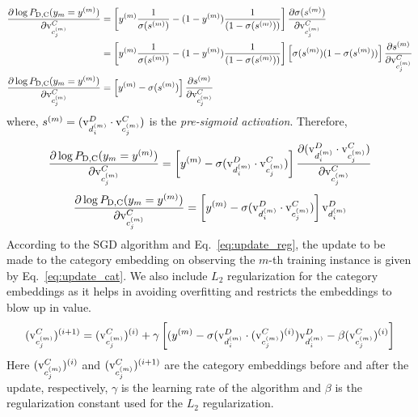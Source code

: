 \begin{align}
\frac{\partial \log P_{\mathrm{D}, \mathrm{C}}(y_{m}=y^{(m)})} {\partial \mathrm{v}^{C}_{c^{(m)}_{j}}} &= \left[ y^{(m)}\frac{1}{\sigma(s^{(m)})} - (1-y^{(m)})\frac{1}{(1 - \sigma(s^{(m)}))}\right] \frac{\partial \sigma(s^{(m)})}{\partial \mathrm{v}^{C}_{c^{(m)}_{j}}} \\
&= \left[ y^{(m)}\frac{1}{\sigma(s^{(m)})} - (1-y^{(m)})\frac{1}{(1 - \sigma(s^{(m)}))}\right] \left[\sigma(s^{(m)})(1-\sigma(s^{(m)}))\right]\frac{\partial s^{(m)}}{\partial \mathrm{v}^{C}_{c^{(m)}_{j}}} \\
\frac{\partial \log P_{\mathrm{D}, \mathrm{C}}(y_{m}=y^{(m)})} {\partial \mathrm{v}^{C}_{c^{(m)}_{j}}} &= \left[ y^{(m)} - \sigma(s^{(m)})\right] \frac{\partial s^{(m)}}{\partial \mathrm{v}^{C}_{c^{(m)}_{j}}}
\end{align}
where, $s^{(m)} = (\mathrm{v}^{D}_{d^{(m)}_{i}}\cdot \mathrm{v}^{C}_{c^{(m)}_{j}})$ is the \emph{pre-sigmoid activation}. Therefore,
\begin{equation}
\frac{\partial \log P_{\mathrm{D}, \mathrm{C}}(y_{m}=y^{(m)})} {\partial \mathrm{v}^{C}_{c^{(m)}_{j}}} = \left[ y^{(m)} - \sigma(\mathrm{v}^{D}_{d^{(m)}_{i}}\cdot \mathrm{v}^{C}_{c^{(m)}_{j}})\right] \frac{\partial (\mathrm{v}^{D}_{d^{(m)}_{i}}\cdot \mathrm{v}^{C}_{c^{(m)}_{j}})}{\partial \mathrm{v}^{C}_{c^{(m)}_{j}}}
\end{equation}
\begin{equation}
\label{eq:grad_c}
\frac{\partial \log P_{\mathrm{D}, \mathrm{C}}(y_{m}=y^{(m)})} {\partial \mathrm{v}^{C}_{c^{(m)}_{j}}} = \left[ y^{(m)} - \sigma(\mathrm{v}^{D}_{d^{(m)}_{i}}\cdot \mathrm{v}^{C}_{c^{(m)}_{j}})\right] \mathrm{v}^{D}_{d^{(m)}_{i}}
\end{equation}
According to the SGD algorithm and Eq.~\ref{eq:update_reg}, the update to be made to the category embedding on observing the $m$-th training instance is given by Eq.~\ref{eq:update_cat}. We also include $L_{2}$
regularization for the category embeddings as it helps in avoiding overfitting and restricts the embeddings to blow up in value.
\begin{equation}
\label{eq:update_cat}
(\mathrm{v}^{C}_{c^{(m)}_{j}})^{(i+1)} = (\mathrm{v}^{C}_{c^{(m)}_{j}})^{(i)} + \gamma \left[ ( y^{(m)} - \sigma(\mathrm{v}^{D}_{d^{(m)}_{i}}\cdot (\mathrm{v}^{C}_{c^{(m)}_{j}})^{(i)}) \mathrm{v}^{D}_{d^{(m)}_{i}} -\beta(\mathrm{v}^{C}_{c^{(m)}_{j}})^{(i)} \right]
\end{equation}
Here $(\mathrm{v}^{C}_{c^{(m)}_{j}})^{(i)}$ and $(\mathrm{v}^{C}_{c^{(m)}_{j}})^{(i+1)}$ are the category embeddings before and after the update, respectively, $\gamma$ is the learning rate of the algorithm and $\beta$ is the regularization constant used for the $L_{2}$ regularization. 

